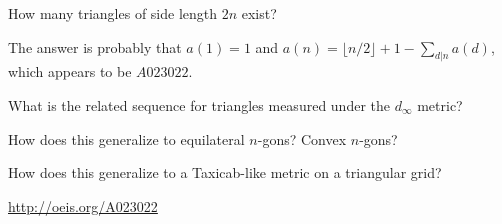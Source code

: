 \documentclass{article}
\begin{document}
\begin{question}
  How many triangles of side length $2n$ exist?
\end{question}
\begin{note}
  The answer is probably that $a(1) = 1$ and $a(n) = \lfloor n/2 \rfloor + 1 - \sum_{d|n} a(d)$,
  which appears to be $A023022$.
\end{note}
\begin{related}
  \item What is the related sequence for triangles measured under the $d_\infty$
    metric?
  \item How does this generalize to equilateral $n$-gons? Convex $n$-gons?
  \item How does this generalize to a Taxicab-like metric on a triangular grid?
\end{related}
\begin{references}
  \item \url{http://oeis.org/A023022}
\end{references}
\end{document}
